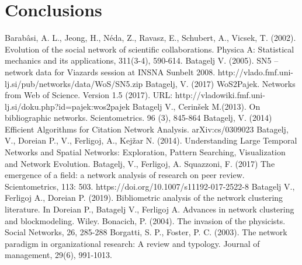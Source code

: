 \documentclass[11pt]{article} %
\begin{document}



\section{Conclusions}




\begin{thebibliography}{99}
   Barabâsi, A. L., Jeong, H., Néda, Z., Ravasz, E., Schubert, A., Vicsek, T. (2002). Evolution of the social network of scientific collaborations. Physica A: Statistical mechanics and its applications, 311(3-4), 590-614.
   Batagelj V. (2005). SN5 -- network data for Viazards session at INSNA Sunbelt 2008. http://vlado.fmf.uni-lj.si/pub/networks/data/WoS/SN5.zip      
   Batagelj, V. (2017) WoS2Pajek. Networks from Web of Science. Version 1.5 (2017). URL: http://vladowiki.fmf.uni-lj.si/doku.php?id=pajek:wos2pajek 
   Batagelj V., Cerinšek M.(2013). On bibliographic networks. Scientometrics. 96 (3), 845-864
   Batagelj, V. (2014) Efficient Algorithms for Citation Network Analysis. arXiv:cs/0309023 
   Batagelj, V., Doreian P., V., Ferligoj, A., Kejžar N. (2014). Understanding Large Temporal Networks and Spatial Networks: Exploration, Pattern Searching, Visualization and Network Evolution. 
   Batagelj, V., Ferligoj, A. Squazzoni, F. (2017) The emergence of a field: a network analysis of research on peer review. Scientometrics,  113: 503. https://doi.org/10.1007/s11192-017-2522-8  
   Batagelj V., Ferligoj A., Doreian P. (2019). Bibliometric analysis of the network clustering literature. In Doreian P., Batagelj V., Ferligoj A. Advances in network clustering and blockmodeling. Wiley. 
   Bonacich, P. (2004). The invasion of the physicists. Social Networks, 26, 285-288
   Borgatti, S. P., Foster, P. C. (2003). The network paradigm in organizational research: A review and typology. Journal of management, 29(6), 991-1013.

\end{thebibliography}
\end{document}
